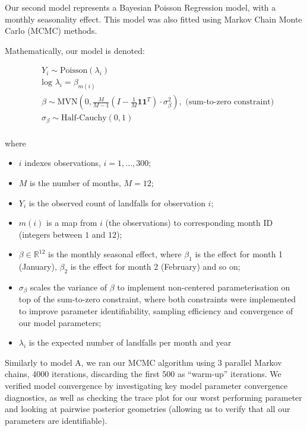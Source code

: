\documentclass[
]{article}
\providecommand{\tightlist}{%
  \setlength{\itemsep}{0pt}\setlength{\parskip}{0pt}}
\begin{document}
Our second model represents a Bayesian Poisson Regression model, with a monthly seasonality effect. This model was also fitted using Markov Chain Monte Carlo (MCMC) methods.

Mathematically, our model is denoted:

\begin{align*}
&Y_{i} \sim \text{Poisson}(\lambda_{i})\\
&\text{log } \lambda_{i} =  \beta_{m(i)}\\
&\beta \sim \text{MVN}( 0, \frac{M}{M-1}( I - \frac{1}{M} \mathbf{1}\mathbf{1}^T) \cdot \sigma_{\beta}^2), \text{  (sum-to-zero constraint)}\\
&\sigma_{\beta} \sim \text{Half-Cauchy}(0,1)\\
\end{align*}

where

\begin{itemize}
\tightlist
\item
  \(i\) indexes observations, \(i=1,...,300\);
\item
  \(M\) is the number of months, \(M = 12\);
\item
  \(Y_{i}\) is the observed count of landfalls for observation \(i\);
\item
  \(m(i)\) is a map from \(i\) (the observations) to corresponding month ID (integers between \(1\) and \(12\));
\item
  \(\beta \in \mathbb{R}^{12}\) is the monthly seasonal effect, where \(\beta_1\) is the effect for month 1 (January), \(\beta_2\) is the effect for month 2 (February) and so on;
\item
  \(\sigma_{\beta}\) scales the variance of \(\beta\) to implement non-centered parameterisation on top of the sum-to-zero constraint, where both constraints were implemented to improve parameter identifiability, sampling efficiency and convergence of our model parameters;
\item
  \(\lambda_{i}\) is the expected number of landfalls per month and year
\end{itemize}

Similarly to model A, we ran our MCMC algorithm using 3 parallel Markov chains, 4000 iterations, discarding the first 500 as ``warm-up'' iterations. We verified model convergence by investigating key model parameter convergence diagnostics, as well as checking the trace plot for our worst performing parameter and looking at pairwise posterior geometries (allowing us to verify that all our parameters are identifiable).
\end{document}

